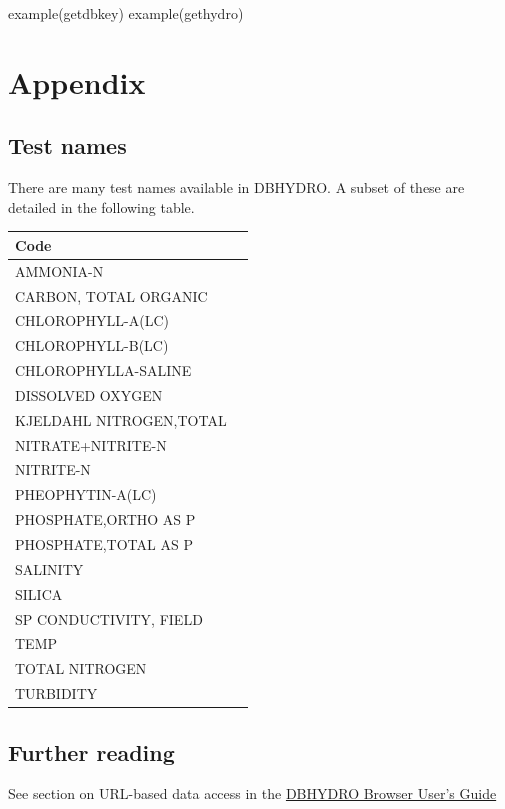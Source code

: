 \documentclass[12pt,notitlepage]{article}
\begin{document}
\begin{Schunk}
\begin{Sinput}
 example(getdbkey)
 example(gethydro)
\end{Sinput}
\end{Schunk}

\newpage

\section{\label{sec:appendix}Appendix}
\subsection{Test names}
There are many test names available in DBHYDRO. A subset of these are detailed in the following table.\\

\begin{longtable}{| p{} | p{} |} 
\hline
Code\\
\hline
AMMONIA-N\\
CARBON, TOTAL ORGANIC\\
CHLOROPHYLL-A(LC)\\
CHLOROPHYLL-B(LC)\\
CHLOROPHYLLA-SALINE\\
DISSOLVED OXYGEN\\
KJELDAHL NITROGEN,TOTAL\\
NITRATE+NITRITE-N\\
NITRITE-N\\
PHEOPHYTIN-A(LC)\\
PHOSPHATE,ORTHO AS P\\
PHOSPHATE,TOTAL AS P\\
SALINITY\\
SILICA\\
SP CONDUCTIVITY, FIELD\\
TEMP\\
TOTAL NITROGEN\\
TURBIDITY\\
\hline
\end{longtable}

\subsection{Further reading}
See section on URL-based data access in the \href{http://www.sfwmd.gov/portal/page/portal/xrepository/sfwmd_repository_pdf/dbhydrobrowseruserdocumentation.pdf}{DBHYDRO Browser User's Guide}

\medskip
 


 
\end{document}
